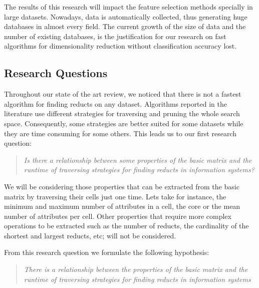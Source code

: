 \documentclass[authoryear,11pt]{elsarticle}
\begin{document}
  The results of this research will impact the feature selection methods specially in large datasets.
  Nowadays, data is automatically collected, thus generating huge databases in almost every field. The 
  current growth of the size of data and the number of existing databases, is the justification for our
  research on fast algorithms for dimensionality reduction without classification accuracy lost.  
  
\subsection{Research Questions}\label{ResearchQuestions} 
  Throughout our state of the art review, we noticed that there is not a fastest algorithm for finding reducts 
  on any dataset. Algorithms reported in the literature use different strategies for traversing and pruning 
  the whole search space. Consequently, some strategies are better suited for some datasets while they are time
  consuming for some others. This leads us to our first research question:
  
\begin{quote}
  \emph{Is there a relationship between some properties of the basic matrix and the runtime 
  		of traversing strategies for finding reducts in information systems?}
\end{quote}
  		
  We will be considering those properties that can be extracted from the basic matrix by traversing their 
  cells just one time. Lets take for instance, the minimum and maximum number of attributes in a cell, the 
  core or the mean number of attributes per cell. Other properties that require more complex operations to 
  be extracted such as the number of reducts, the cardinality of the shortest and largest reducts, etc; 
  will not be considered.
  
  From this research question we formulate the following hypothesis:
  
\begin{quote}  
  \emph{There is a relationship between the properties of the basic matrix and the runtime 
  		of traversing strategies for finding reducts in information systems}
\end{quote}
  		
\end{document}
